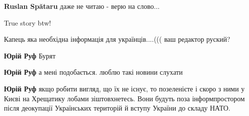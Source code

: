 \begin{itemize}
\begin{itemize}
\textbf{Ruslan Spătaru} даже не читаю - верю на слово...
\end{itemize}

 
True story btw!

 
Капець яка необхідна інформація для українців....((( ваш редактор руский?

\begin{itemize}
 
\textbf{Юрій Руф} Бурят

 
\textbf{Юрій Руф} а мені подобається. люблю такі новини слухати

 
\textbf{Юрій Руф} якщо робити вигляд, що їх не існує, то позеленієте і скоро з
ними у Києві на Хрещатику лобами зіштовхнетесь. Вони будуть поза
інформпростором після деокупації Українських територій й вступу України до
складу НАТО.
\end{itemize}

 

\end{itemize}
